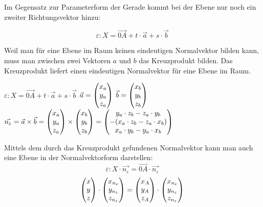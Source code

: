 
Im Gegensatz zur Parameterform der Gerade kommt bei der Ebene nur noch ein zweiter Richtungsvektor hinzu:

$$\varepsilon: X = \vec{0A} + t \cdot \vec{a} + s \cdot \vec{b}$$


Weil man f\"{u}r eine Ebene im Raum keinen eindeutigen Normalvektor bilden kann, muss man zwischen zwei Vektoren $a$ und $b$ das Kreuzprodukt bilden. Das Kreuzprodukt liefert einen eindeutigen Normalvektor f\"{u}r eine Ebene im Raum.

\begin{center}
  $\varepsilon: X = \vec{0A} + t \cdot \vec{a} + s \cdot \vec{b}$
  \extrapar
  $ \vec{a} = \begin{pmatrix}x_{a}\\y_{a}\\z_{a}\end{pmatrix}$
  \extrapar
  $ \vec{b} = \begin{pmatrix}x_{b}\\y_{b}\\z_{b}\end{pmatrix}$
  \extrapar
  $ \vec{n_{\varepsilon}} 
    = \vec{a} \times \vec{b} 
    = \begin{pmatrix}x_{a}\\y_{a}\\z_{a}\end{pmatrix} \times \begin{pmatrix}x_{b}\\y_{b}\\z_{b}\end{pmatrix} 
    = \begin{pmatrix}y_{a} \cdot z_{b} - z_{a} \cdot y_{b}\\ - (x_{a} \cdot z_{b} - z_{a} \cdot x_{b})\\x_{a} \cdot y_{b} - y_{a} \cdot x_{b}\end{pmatrix}$  
\end{center}

\pagebreak


Mittels dem durch das Kreuzprodukt gefundenen Normalvektor kann man auch eine Ebene in der Normalvektorform darstellen: $$\varepsilon: X \cdot \vec{n_{\varepsilon}} = \vec{0A} \cdot \vec{n_{\varepsilon}}$$ $$\begin{pmatrix}x \\ y \\ z\end{pmatrix} \cdot \begin{pmatrix}x_{n_{\varepsilon}} \\ y_{n_{\varepsilon}} \\ z_{n_{\varepsilon}}\end{pmatrix} = \begin{pmatrix}x_{A} \\ y_{A} \\ z_{A}\end{pmatrix} \cdot \begin{pmatrix}x_{n_{\varepsilon}} \\ y_{n_{\varepsilon}} \\ z_{n_{\varepsilon}}\end{pmatrix}$$


